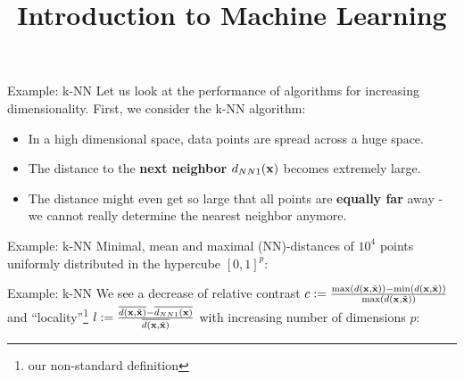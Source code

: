 \documentclass[11pt,compress,t,notes=noshow, xcolor=table]{beamer}
\title{Introduction to Machine Learning}
\begin{document}

\begin{framev}{Example: k-NN}
Let us look at the performance of algorithms for increasing dimensionality. First, we consider the k-NN algorithm:

\begin{itemize}
\item In a high dimensional space, data points are spread across a huge space.
\item The distance to the \textbf{next neighbor} $d_{NN1}(\mathbf{x})$ becomes extremely large.
\item The distance might even get so large that all points are \textbf{equally far} away - we cannot really determine the nearest neighbor anymore.
\end{itemize}
\end{framev}

\begin{framev}{Example: k-NN}
Minimal, mean and maximal (NN)-distances of $10^{4}$ points uniformly distributed in the hypercube $[0,1]^p$:

\vfill


\vfill
\end{framev}

\begin{framev}{Example: k-NN}
We see a decrease of relative contrast $c := \frac{\max(d(\mathbf{x},\tilde{\mathbf{x}})) - \min(d(\mathbf{x},\tilde{\mathbf{x}}))}{\max(d(\mathbf{x},\tilde{\mathbf{x}}))}$
and \enquote{locality}\footnote{our non-standard definition} $l := \frac{\overline{d(\mathbf{x},\tilde{\mathbf{x}})} -  \overline{d_{NN1}(\mathbf{x})}}{\overline{d(\mathbf{x},\tilde{\mathbf{x}})}}$ with increasing number of dimensions $p$:

\vfill

\end{framev}
\end{document}
